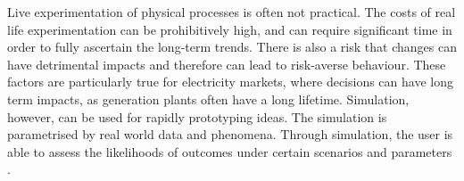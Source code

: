 

Live experimentation of physical processes is often not practical. The costs of real life experimentation can be prohibitively high, and can require significant time in order to fully ascertain the long-term trends. There is also a risk that changes can have detrimental impacts and therefore can lead to risk-averse behaviour. These factors are particularly true for electricity markets, where decisions can have long term impacts, as generation plants often have a long lifetime. Simulation, however, can be used for rapidly prototyping ideas. The simulation is parametrised by real world data and phenomena. Through simulation, the user is able to assess the likelihoods of outcomes under certain scenarios and parameters \cite{Law:603360}.



